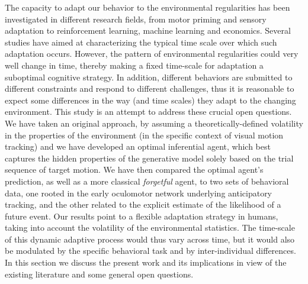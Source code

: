 \documentclass[10pt,letterpaper]{article}
\newcommand{\AM}[1]{\textbf{\textcolor{blue}{[AM: #1]}}}
\begin{document}
The capacity to adapt our behavior to the environmental regularities has been investigated in different research fields, from motor priming and sensory adaptation to reinforcement learning, machine learning and economics. Several studies have aimed at characterizing the typical time scale over which such adaptation occurs. However, the pattern of environmental regularities could very well change in time, thereby making a fixed time-scale for adaptation a suboptimal cognitive strategy. In addition, different behaviors are submitted to different constraints and respond to different challenges, thus it is reasonable to expect some differences in the way (and time scales) they adapt to the changing environment. This study is an attempt to address these crucial open questions. We have taken an original approach, by assuming a theoretically-defined volatility in the properties of the environment (in the specific context of visual motion tracking) and we have developed an optimal inferential agent, which best captures the hidden properties of the generative model solely based on the trial sequence of target motion. We have then compared the optimal agent's prediction, as well as a more classical \textit{forgetful} agent, to two sets of behavioral data, one rooted in the early oculomotor network underlying anticipatory  tracking, and the other related to the explicit estimate of the likelihood of a future event. Our results point to a flexible adaptation strategy in humans, taking into account the volatility of the environmental statistics. The time-scale of this dynamic adaptive process would thus vary across time, but it would also be modulated by the specific behavioral task and by inter-individual differences. In this section we discuss the present work and its implications in view of the existing literature and some general open questions.

\end{document}
